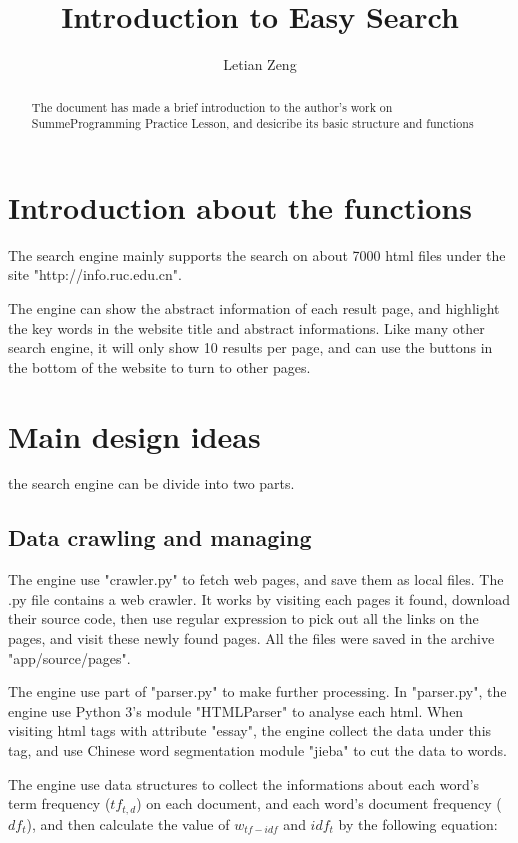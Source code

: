 \documentclass[a4paper]{article}
\title{Introduction to Easy Search}
\author{Letian Zeng}
\begin{document}
\maketitle

\begin{abstract}
The document has made a brief introduction to the author's work on SummeProgramming Practice Lesson, and desicribe its basic structure and functions 
\end{abstract}

\section{Introduction about the functions}

The search engine mainly supports the search on about 7000 html files under the site "http://info.ruc.edu.cn". 

The engine can show the abstract information of each result page, and highlight the key words in the website title and abstract informations. Like many other search engine, it will only show 10 results per page, and can use the buttons in the bottom of the website to turn to other pages. 

\section{Main design ideas}

the search engine can be divide into two parts. 

\subsection{Data crawling and managing}

The engine use "crawler.py" to fetch web pages, and save them as local files. The .py file contains a web crawler. It works by visiting each pages it found, download their source code, then use regular expression to pick out all the links on the pages, and visit these newly found pages. All the files were saved in the archive "app/source/pages".

The engine use part of "parser.py" to make further processing. In "parser.py", the engine use Python 3's module "HTMLParser" to analyse each html. When visiting html tags with attribute "essay", the engine collect the data under this tag, and use Chinese word segmentation module "jieba" to cut the data to words. 

The engine use data structures to collect the informations about each word's term frequency ($tf_{t,d}$) on each document, and each word's document frequency ($df_t$), and then calculate the value of $w_{tf-idf}$ and $idf_t$ by the following equation:
\end{document}
